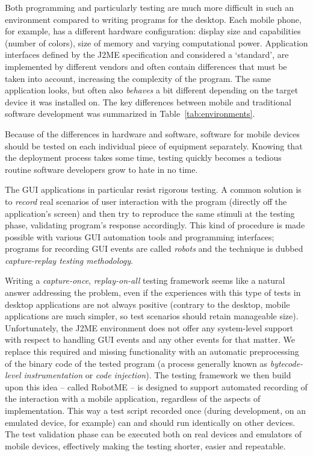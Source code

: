 Both programming and particularly testing are much more difficult in such an environment
compared to writing programs for the desktop. Each mobile phone, for example, has a different
hardware configuration: display size and capabilities (number of colors), size of memory and varying
computational power. Application interfaces defined by the J2ME specification and considered a
`standard', are implemented by different vendors and often contain differences that must be taken
into account, increasing the complexity of the program. The same application looks, but often also
\emph{behaves} a bit different depending on the target device it was installed on. 
The key differences between mobile and traditional software development was summarized in 
Table~\ref{tab:environments}.



Because of the differences in hardware and software, software for mobile devices should be tested on
each individual piece of equipment separately. Knowing that the deployment process takes some time,
testing quickly becomes a tedious routine software developers grow to hate in no time. 

The GUI applications in particular resist rigorous testing.
A common solution is to \emph{record} real scenarios of user interaction with the program (directly
off the application's screen) and then try to reproduce the same stimuli at the testing phase,
validating program's response accordingly. This kind of procedure is made possible with various
GUI automation tools and programming interfaces; programs for recording GUI
events are called \emph{robots} and the technique is dubbed \emph{capture-replay testing methodology}.

Writing a \emph{capture-once}, \emph{replay-on-all} testing framework seems like a natural answer addressing
the problem, even if the experiences with this type of tests in desktop applications are not always
positive (contrary to the desktop, mobile applications are much simpler, so test scenarios
should retain manageable size). 
Unfortunately, the J2ME environment does not offer any system-level 
support with respect to handling GUI events and any other events for that matter. 
We replace this required and missing functionality with
an automatic preprocessing of the binary code of the tested program (a process generally
known as \emph{bytecode-level instrumentation} or \emph{code injection}).
The testing framework we then build upon this idea -- called RobotME -- is designed to support automated recording
of the interaction with a mobile application, regardless of the aspects of implementation. This way a test script recorded
once (during development, on an emulated device, for example) can and should run identically on other devices. 
The test validation phase can be executed both on real devices and emulators of mobile devices, effectively making the testing
shorter, easier and repeatable.


